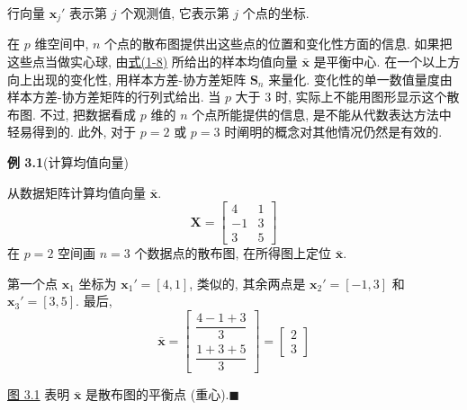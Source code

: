 行向量 $\mathbf{x}_{j}'$ 表示第 $j$ 个观测值, 它表示第 $j$ 个点的坐标.

在 $p$ 维空间中, $n$ 个点的散布图提供出这些点的位置和变化性方面的信息. 如果把这些点当做实心球, 由\hyperref[eq:1-8]{式(1-8)} 所给出的样本均值向量 $\bar{\mathbf{x}}$ 是平衡中心. 在一个以上方向上出现的变化性, 用样本方差-协方差矩阵 $\mathbf{S}_{n}$ 来量化. 变化性的单一数值量度由样本方差-协方差矩阵的行列式给出. 当 $p$ 大于 3 时, 实际上不能用图形显示这个散布图. 不过, 把数据看成 $p$ 维的 $n$ 个点所能提供的信息, 是不能从代数表达方法中轻易得到的. 此外, 对于 $p=2$ 或 $p=3$ 时阐明的概念对其他情况仍然是有效的.

\medskip
\noindent\textbf{例 3.1}\quad (计算均值向量)

从数据矩阵计算均值向量 $\bar{\mathbf{x}}$.
\[
\mathbf{X}=\begin{bmatrix}4&1\\-1&3\\3&5\end{bmatrix}
\]
在 $p=2$ 空间画 $n=3$ 个数据点的散布图, 在所得图上定位 $\bar{\mathbf{x}}$.

第一个点 $\mathbf{x}_{1}$ 坐标为 $\mathbf{x}_{1}'=[4,1]$, 类似的, 其余两点是 $\mathbf{x}_{2}'=[-1,3]$ 和 $\mathbf{x}_{3}'=[3,5]$. 最后,
\[
\bar{\mathbf{x}}=\begin{bmatrix}\dfrac{4-1+3}{3}\\[8pt]\dfrac{1+3+5}{3}\end{bmatrix}=\begin{bmatrix}2\\3\end{bmatrix}
\]

\hyperref[fig:3.1]{图 3.1} 表明 $\bar{\mathbf{x}}$ 是散布图的平衡点 (重心).\hfill$\blacksquare$

\begin{figure}[H]
\centering
{}
\label{fig:3.1}
\end{figure}

